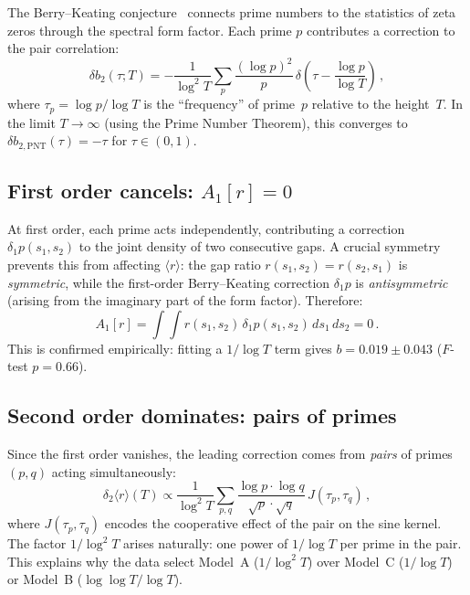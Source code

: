 \documentclass[10pt]{article}
\begin{document}
The Berry--Keating conjecture~\cite{berry1999,bogomolny1996} connects
prime numbers to the statistics of zeta zeros through the spectral form
factor. Each prime $p$ contributes a correction to the pair correlation:
\begin{equation}
\delta b_2(\tau; T) = -\frac{1}{\log^2 T}
\sum_p \frac{(\log p)^2}{p}\,
\delta\!\left(\tau - \frac{\log p}{\log T}\right)\,,
\label{eq:bk_correction}
\end{equation}
where $\tau_p = \log p / \log T$ is the ``frequency'' of prime~$p$ relative
to the height~$T$. In the limit $T \to \infty$ (using the Prime Number
Theorem), this converges to $\delta b_{2,\mathrm{PNT}}(\tau) = -\tau$ for
$\tau \in (0,1)$.

\subsection{First order cancels: $A_1[r] = 0$}

At first order, each prime acts independently, contributing a correction
$\delta_1 p(s_1, s_2)$ to the joint density of two consecutive gaps. A
crucial symmetry prevents this from affecting $\langle r\rangle$: the gap
ratio $r(s_1,s_2) = r(s_2,s_1)$ is \emph{symmetric}, while the first-order
Berry--Keating correction $\delta_1 p$ is \emph{antisymmetric} (arising from
the imaginary part of the form factor). Therefore:
\begin{equation}
A_1[r] = \int\!\!\int r(s_1,s_2)\,\delta_1 p(s_1,s_2)\,ds_1\,ds_2 = 0\,.
\label{eq:A1_zero}
\end{equation}
This is confirmed empirically: fitting a $1/\log T$ term gives
$b = 0.019 \pm 0.043$ ($F$-test $p = 0.66$).

\subsection{Second order dominates: pairs of primes}

Since the first order vanishes, the leading correction comes from
\emph{pairs} of primes $(p, q)$ acting simultaneously:
\begin{equation}
\delta_2\langle r\rangle(T) \propto
\frac{1}{\log^2 T}\sum_{p,q}
\frac{\log p \cdot \log q}{\sqrt{p}\cdot\sqrt{q}}\, J(\tau_p, \tau_q)\,,
\label{eq:second_order}
\end{equation}
where $J(\tau_p, \tau_q)$ encodes the cooperative effect of the pair on the
sine kernel. The factor $1/\log^2 T$ arises naturally: one power of
$1/\log T$ per prime in the pair. This explains why the data select
Model~A ($1/\log^2 T$) over Model~C ($1/\log T$) or Model~B
($\log\log T / \log T$).
\end{document}
